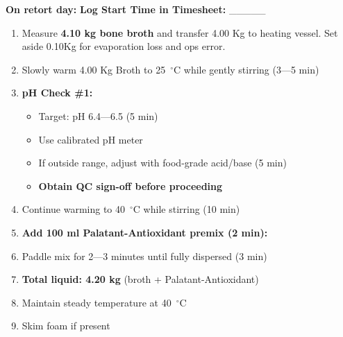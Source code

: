\textbf{On retort day:}
\textbf{Log Start Time in Timesheet:} \_\_\_\_\_ 
\begin{enumerate}[resume,leftmargin=1.5em]
\item Measure \textbf{4.10 kg bone broth} and transfer 4.00 Kg to heating vessel.
Set aside 0.10Kg for evaporation loss and ops error.
\item Slowly warm 4.00 Kg Broth to 25~$^\circ$C while gently stirring (3---5 min)
\item \textbf{pH Check \#1:}
  \begin{itemize}
  \item Target: pH 6.4---6.5 (5 min)
  \item Use calibrated pH meter
  \item If outside range, adjust with food-grade acid/base (5 min)
  \item \textbf{Obtain QC sign-off before proceeding}
  \end{itemize}
\item Continue warming to 40~$^\circ$C while stirring (10 min)
\item \textbf{Add 100 ml Palatant-Antioxidant premix (2 min):}
  
  
\item Paddle mix for 2---3 minutes until fully dispersed (3 min)
\item \textbf{Total liquid: 4.20 kg} (broth + Palatant-Antioxidant)
\item Maintain steady temperature at 40~$^\circ$C
\item Skim foam if present 
\end{enumerate}

